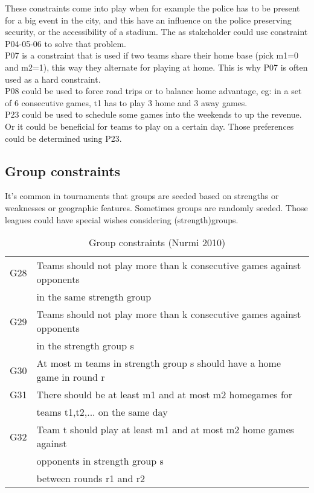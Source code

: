 These constraints come into play when for example the police has to be present for a big event in the city, and this have an influence on the police preserving security, or the accessibility of a stadium. The as stakeholder could use constraint P04-05-06 to solve that problem. 
\\[5px]
P07 is a constraint that is used if two teams share their home base (pick m1=0 and m2=1), this way they alternate for playing at home. This is why P07 is often used as a hard constraint.
\\[5px]
P08 could be used to force road trips or to balance home advantage,  eg: in a set of 6 consecutive games, t1 has to play 3 home and 3 away games. 
\\[5px]
P23 could be used to schedule some games into the weekends to up the revenue. Or it could be beneficial for teams to play on a certain day. Those preferences could be determined using P23.

\subsection{Group constraints}

It’s common in tournaments that groups are seeded based on strengths or weaknesses or geographic features. Sometimes groups are randomly seeded. Those leagues could have special wishes considering (strength)groups.
\\[5px]
\begin{table}[h]
\begin{tabular}{|l|l|}
\hline
G28 & Teams should not play more than k consecutive games against opponents\\ & in the same strength group                                                                   \\
\hline
G29 & Teams should not play more than k consecutive games against opponents\\ & in the strength group s                                                                      \\
\hline
G30 & At most m teams in strength group s should have a home game in round r                                                                                             \\
\hline
G31 & There should be at least m1 and at most m2 homegames for \\ & teams t1,t2,... on the same day                                                                           \\
\hline
G32 & Team t should play at least m1 and at most m2 home games against \\ & opponents in strength group s 
\\ & between rounds r1 and r2
\\
\hline
\end{tabular}
\caption{Group constraints (Nurmi 2010)}
\label{tbl4}
\end{table}

